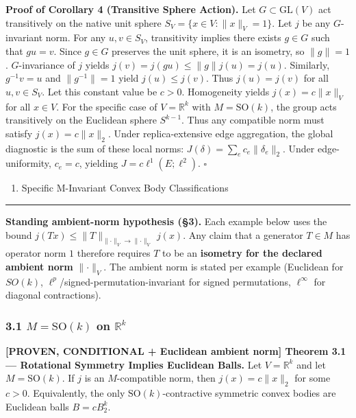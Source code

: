 \documentclass[
  11pt,
]{article}
\providecommand{\tightlist}{%
  \setlength{\itemsep}{0pt}\setlength{\parskip}{0pt}}
\providecommand{\tightlist}{%
  \setlength{\itemsep}{0pt}\setlength{\parskip}{0pt}}
\begin{document}
\textbf{Proof of Corollary 4 (Transitive Sphere Action).} Let \(G \subset \text{GL}(V)\) act transitively on the native unit sphere \(S_V = \{x \in V : \|x\|_V = 1\}\). Let \(j\) be any \(G\)-invariant norm. For any \(u, v \in S_V\), transitivity implies there exists \(g \in G\) such that \(g u = v\).
Since \(g \in G\) preserves the unit sphere, it is an isometry, so \(\|g\| = 1\). \(G\)-invariance of \(j\) yields \(j(v) = j(g u) \leq \|g\| j(u) = j(u)\). Similarly, \(g^{-1} v = u\) and \(\|g^{-1}\| = 1\) yield \(j(u) \leq j(v)\).
Thus \(j(u) = j(v)\) for all \(u, v \in S_V\). Let this constant value be \(c > 0\). Homogeneity yields \(j(x) = c \|x\|_V\) for all \(x \in V\).
For the specific case of \(V = \mathbb{R}^k\) with \(M = \mathrm{SO}(k)\), the group acts transitively on the Euclidean sphere \(S^{k-1}\). Thus any compatible norm must satisfy \(j(x) = c \|x\|_2\). Under replica-extensive edge aggregation, the global diagnostic is the sum of these local norms: \(J(\delta) = \sum_e c_e \|\delta_e\|_2\). Under edge-uniformity, \(c_e = c\), yielding \(J = c \ell^1(E; \ell^2).\) \(\square\)

\begin{enumerate}
\def\labelenumi{\arabic{enumi}.}
\setcounter{enumi}{2}
\tightlist
\item
  Specific M-Invariant Convex Body Classifications
\end{enumerate}

\begin{center}\rule{0.5\linewidth}{0.5pt}\end{center}

\textbf{Standing ambient-norm hypothesis (§3).} Each example below uses the bound \(j(Tx)\le \lVert T\rVert_{\lVert\cdot\rVert_V\to\lVert\cdot\rVert_V}\, j(x)\). Any claim that a generator \(T\in M\) has operator norm \(1\) therefore requires \(T\) to be an \textbf{isometry for the declared ambient norm} \(\lVert\cdot\rVert_V\). The ambient norm is stated per example (Euclidean for \(SO(k)\), \(\ell^p\)/signed-permutation-invariant for signed permutations, \(\ell^\infty\) for diagonal contractions).

\subsubsection{\texorpdfstring{3.1 \(M = \mathrm{SO}(k)\) on \(\mathbb{R}^k\)}{3.1 M = \textbackslash mathrm\{SO\}(k) on \textbackslash mathbb\{R\}\^{}k}}\label{m-mathrmsok-on-mathbbrk}

\textbf{{[}PROVEN, CONDITIONAL + Euclidean ambient norm{]} Theorem 3.1 --- Rotational Symmetry Implies Euclidean Balls.} Let \(V=\mathbb{R}^k\) and let \(M=\mathrm{SO}(k)\). If \(j\) is an \(M\)-compatible norm, then \(j(x)=c\|x\|_2\) for some \(c > 0\). Equivalently, the only \(\mathrm{SO}(k)\)-contractive symmetric convex bodies are Euclidean balls \(B=c B_2^k\).
\end{document}

